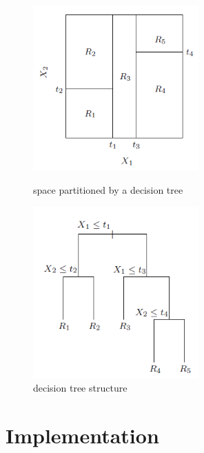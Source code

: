 \documentclass[12pt]{article}
\begin{document}

\begin{figure}[h!]
\centering
\begin{minipage}{0.45\textwidth}
\centering
\includegraphics[width=2.5in]{partition}
\caption{space partitioned by a decision tree}
\end{minipage}\hfill
\begin{minipage}{0.45\textwidth}
\centering
\includegraphics[width=2.5in]{dectree}
\caption{decision tree structure}
\end{minipage}
\end{figure}

\section{Implementation}
\end{document}
